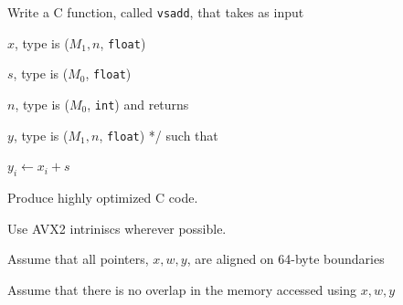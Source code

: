 \documentclass[letterpaper,12pt]{article}
\begin{document}



Write a C function, called {\tt vsadd}, that takes as input
\be
\item \(x\), type is (\(M_1, n\), {\tt float})
\item \(s\), type is (\(M_0\), {\tt float})
\item \(n\), type is (\(M_0\), {\tt int})
\ee
and returns 
\be
\item \(y\), type is (\(M_1, n\), {\tt float}) */ 
\ee
such that 
\be
\item \(y_i \leftarrow x_i + s \)
  \ee

  \be
\item Produce highly optimized C code.
\item Use AVX2 intriniscs wherever possible.
\item Assume that all pointers, \(x, w, y\), are aligned on 64-byte boundaries
\item Assume that there is no overlap in the memory accessed using \(x, w, y\)
  \ee
\end{document}
